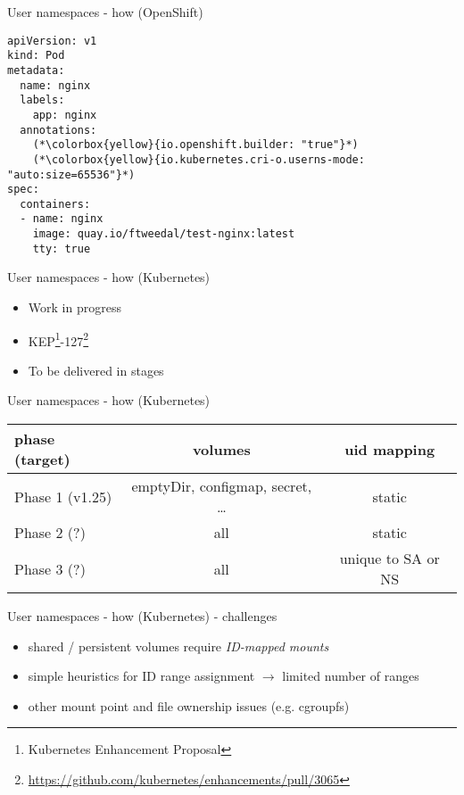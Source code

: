 \documentclass[ignorenonframetext,aspectratio=169,12pt]{beamer}
\begin{document}
\begin{frame}[fragile]{User namespaces - how (OpenShift)}
\protect\hypertarget{userns-how-openshift-2}{}
\begin{lstlisting}
apiVersion: v1
kind: Pod
metadata:
  name: nginx
  labels:
    app: nginx
  annotations:
    (*\colorbox{yellow}{io.openshift.builder: "true"}*)
    (*\colorbox{yellow}{io.kubernetes.cri-o.userns-mode: "auto:size=65536"}*)
spec:
  containers:
  - name: nginx
    image: quay.io/ftweedal/test-nginx:latest
    tty: true
\end{lstlisting}
\end{frame}

\begin{frame}{User namespaces - how (Kubernetes)}
\protect\hypertarget{userns-how-kubernetes}{}
\begin{itemize}
\item Work in progress
\item KEP\footnote{Kubernetes Enhancement Proposal}-127\footnote{\url{https://github.com/kubernetes/enhancements/pull/3065}}
\item To be delivered in stages
\end{itemize}
\end{frame}

\begin{frame}{User namespaces - how (Kubernetes)}
\protect\hypertarget{userns-how-kubernetes-2}{}
  \centering
  \def\arraystretch{1.5}
  \begin{tabular}{|l|c|c|}
    {\bf phase (target)} & {\bf volumes} & {\bf uid mapping} \\
    \hline
    Phase 1 (v1.25) & \raggedright emptyDir, configmap, secret, \ldots{} & static \\
    Phase 2 (?)     & all                                   & static \\
    Phase 3 (?)     & all                                   & unique to SA or NS \\
  \end{tabular}
\end{frame}

\begin{frame}{User namespaces - how (Kubernetes) - challenges}
\protect\hypertarget{userns-how-kubernetes-3}{}
\begin{itemize}
\item shared / persistent volumes require {\em ID-mapped mounts}
\item simple heuristics for ID range assignment $\to$ limited number
  of ranges
\item other mount point and file ownership issues (e.g. cgroupfs)
\end{itemize}
\end{frame}
\end{document}
